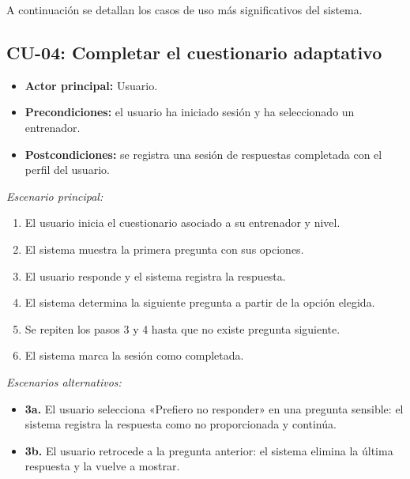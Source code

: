 A continuación se detallan los casos de uso más significativos del sistema.

\subsection*{CU-04: Completar el cuestionario adaptativo}
\begin{itemize}
    \item \textbf{Actor principal:} Usuario.
    \item \textbf{Precondiciones:} el usuario ha iniciado sesión y ha seleccionado un entrenador.
    \item \textbf{Postcondiciones:} se registra una sesión de respuestas completada con el perfil del usuario.
\end{itemize}
\textit{Escenario principal:}
\begin{enumerate}
    \item El usuario inicia el cuestionario asociado a su entrenador y nivel.
    \item El sistema muestra la primera pregunta con sus opciones.
    \item El usuario responde y el sistema registra la respuesta.
    \item El sistema determina la siguiente pregunta a partir de la opción elegida.
    \item Se repiten los pasos 3 y 4 hasta que no existe pregunta siguiente.
    \item El sistema marca la sesión como completada.
\end{enumerate}
\textit{Escenarios alternativos:}
\begin{itemize}
    \item \textbf{3a.} El usuario selecciona «Prefiero no responder» en una pregunta sensible: el sistema registra la respuesta como no proporcionada y continúa.
    \item \textbf{3b.} El usuario retrocede a la pregunta anterior: el sistema elimina la última respuesta y la vuelve a mostrar.
\end{itemize}

